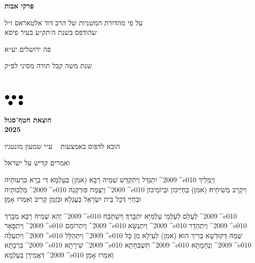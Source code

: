 \documentclass[12pt, a5paper, twoside, extrafontsizes]{memoir}
\renewcommand{\leadword}[1]{%
  \lettrine[lines=2]{#1}{}
}
\renewcommand{\hdot}{\textenglish{^^^^2009}^^^^e010 }
\newcommand{\para}[2]{\leadword{#1}#2}
\begin{document}
\larger[1]
\frontmatter
\pagestyle{myheadings}
\thispagestyle{mytitlepage}
{
  \Centering
      {\Huge\bfseries פרקי אבות}
      
      \large
      \vspace{2.5em}
      על פי מהדורת המשניות של הרב דוד אלטאראס ז״ל\\
      שהודפס בשנת ה׳תק״ע בעיר פיסא

      \vspace{8em}
      פה {\huge ירושלים} יע״א

      שנת {\LARGE משה} קבל {\LARGE ת}ור{\LARGE ה מ}סיני
      לפ״ק

      \vspace{2em}\

      \includegraphics[width=10mm]{hatafSegolLogoNoText.png}\\

      \vspace{.5em}
             {
               \bfseries הוצאת חטף־סגול\\2025

               {\footnotesize  הובא לדפוס באמצעות
                 \textenglish{\XeLaTeX\ }
                 ע״י שמעון מונטגיו}

             }
}

\mainmatter
\setcounter{perekCount}{0}
\setcounter{halachaCount}{0}



\clearpage
    {
      \center ואמרים קדיש על ישראל

    }

    \para{יִתְגַּדַּל}{וְיִתְקַדַּשׁ שְׁמֵיהּ רַבָּא׃ ({\smaller אמן})
      בְּעָלְמָא דִּי בְרָא כִּרְעוּתֵיהּ\hdot
      וְיַמְלִיךְ מַלְכוּתֵיהּ\hdot
      וְיַצְמַח פּוּרְקָנֵהּ\hdot
      וִיקָרֵב מְשִׁיחֵיהּ׃ ({\smaller אמן})
      בְּחַיֵּיכוֹן וּבְיוֹמֵיכוֹן וּבְחַיֵּי דְכָל בֵּית יִשְׂרָאֵל בַּעֲגָלָא
      וּבִזְמַן קָרִיב וְאִמְרוּ אָמֵן׃}

    \para{יְהֵא}{שְׁמֵיהּ רַבָּא מְבָרַךְ\hdot
      לְעָלַם לְעָלְמֵי עָלְמַיָּא יִתְבָּרַךְ׃ וְיִשְׁתַּבַּח\hdot
      וְיִתְפָּאַר\hdot וְיִתְרוֹמַם\hdot וְיִתְנַשֵּׂא\hdot וְיִתְהַדָּר\hdot וְיִתְעַלֶּה\hdot
      וְיִתְהַלָּל\hdot  שְׁמֵהּ דְּקוּדְשָׁא בְּרִיךְ הוּא׃ ({\smaller אמן})
      לְעֵילָא מִן כָּל בִּרְכָתָא\hdot שִׁירָתָא\hdot תִּשְׁבְּחָתָא\hdot וְנֶחָמָתָא\hdot
      דַּאֲמִירָן בְּעָלְמָא\hdot וְאִמְרוּ אָמֵן׃}
\end{document}
